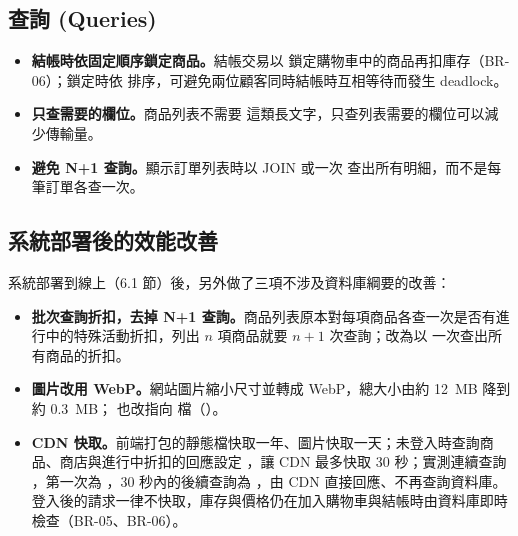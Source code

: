 \subsection{查詢 (Queries)}

\begin{itemize}[itemsep=0.3em]
  \item \textbf{結帳時依固定順序鎖定商品。}結帳交易以  鎖定購物車中的商品再扣庫存（BR-06）；鎖定時依  排序，可避免兩位顧客同時結帳時互相等待而發生 deadlock。
  \item \textbf{只查需要的欄位。}商品列表不需要  這類長文字，只查列表需要的欄位可以減少傳輸量。
  \item \textbf{避免 N+1 查詢。}顯示訂單列表時以 JOIN 或一次  查出所有明細，而不是每筆訂單各查一次。
\end{itemize}

\subsection{系統部署後的效能改善}

系統部署到線上（6.1 節）後，另外做了三項不涉及資料庫綱要的改善：
\begin{itemize}[itemsep=0.3em]
  \item \textbf{批次查詢折扣，去掉 N+1 查詢。}商品列表原本對每項商品各查一次是否有進行中的特殊活動折扣，列出 $n$ 項商品就要 $n+1$ 次查詢；改為以  一次查出所有商品的折扣。
  \item \textbf{圖片改用 WebP。}網站圖片縮小尺寸並轉成 WebP，總大小由約 12~MB 降到約 0.3~MB； 也改指向  檔（）。
  \item \textbf{CDN 快取。}前端打包的靜態檔快取一年、圖片快取一天；未登入時查詢商品、商店與進行中折扣的回應設定 ，讓 CDN 最多快取 30 秒；實測連續查詢 ，第一次為 ，30 秒內的後續查詢為 ，由 CDN 直接回應、不再查詢資料庫。登入後的請求一律不快取，庫存與價格仍在加入購物車與結帳時由資料庫即時檢查（BR-05、BR-06）。
\end{itemize}
